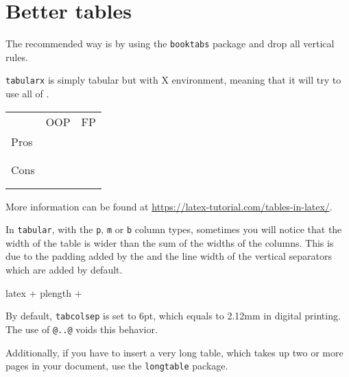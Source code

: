\section{Better tables}
The recommended way is by using the \texttt{booktabs} package and drop all vertical rules.

\texttt{tabularx} is simply tabular but with X environment, meaning that it will try to use all of \texttt{\linewidth}.

\begin{center}
  \begin{tabularx}{\linewidth}{l*{2}{X}}
    \toprule
         & OOP & FP \\
    \cmidrule(lr){2-3}
    Pros &     &    \\
         &     &    \\
         &     &    \\
    \midrule
    Cons &     &    \\
         &     &    \\
         &     &    \\
    \bottomrule
  \end{tabularx}
\end{center}

More information can be found at \url{https://latex-tutorial.com/tables-in-latex/}.

In \texttt{tabular}, with the \texttt{p}, \texttt{m} or \texttt{b} column types, sometimes you will notice that the width of the table is wider than the sum of the widths of the columns.
This is due to the padding added by the \texttt{\tabcolsep} and the line width of the vertical separators which are added by default.

\begin{code}{latex}
  \tabcolsep + p{length} + \tabcolsep
\end{code}

By default, \texttt{tabcolsep} is set to 6pt, which equals to 2.12mm in digital printing.
The use of \texttt{@{}..@{}} voids this behavior.

Additionally, if you have to insert a very long table, which takes up two or more pages in your document, use the \texttt{longtable} package.

